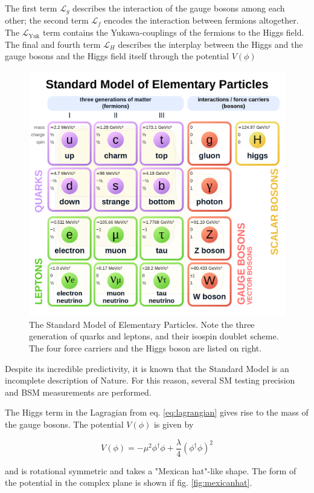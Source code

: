 The first term $\mathcal{L}_g$ describes the interaction of the gauge bosons among each other; the second term $\mathcal{L}_f$ encodes the interaction between fermions altogether. The $\mathcal{L}_\text{Yuk}$ term contains the Yukawa-couplings of the fermions to the Higgs field. The final and fourth term $\mathcal{L}_H$ describes the interplay between the Higgs and the gauge bosons and the Higgs field itself through the potential $V(\phi)$

\begin{figure}[h!]
	\centering
	\includegraphics[width=0.6\linewidth]{figures/theory/sm.png}
	\caption{The Standard Model of Elementary Particles. Note the three generation of quarks and leptons, and their isospin doublet scheme. The four force carriers and the Higgs boson are listed on right. \cite{enwiki:1101993746}}
	\label{fig:sm}
\end{figure}

Despite its incredible predictivity, it is known that the Standard Model is an incomplete description of Nature. For this reason, several SM testing precision and BSM measurements are performed.

The Higgs term in the Lagragian from eq. \ref{eq:lagrangian} gives rise to the mass of the gauge bosons. The potential $V(\phi)$ is given by

\begin{equation*}
	V(\phi) = -\mu^2 \phi^\dagger \phi + \frac{\lambda}{4}\left(\phi^\dagger\phi\right)^2 
\end{equation*}

and is rotational symmetric and takes a "Mexican hat"-like shape. The form of the potential in the complex plane is shown if fig. \ref{fig:mexicanhat}.

